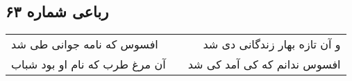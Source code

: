 \begin{center}
\section*{رباعی شماره ۶۳}
\label{sec:sh063}
\begin{longtable}{l p{0.5cm} r}
افسوس که نامه جوانی طی شد
&&
و آن تازه بهار زندگانی دی شد
\\
آن مرغ طرب که نام او بود شباب
&&
افسوس ندانم که کی آمد کی شد
\\
\end{longtable}
\end{center}
